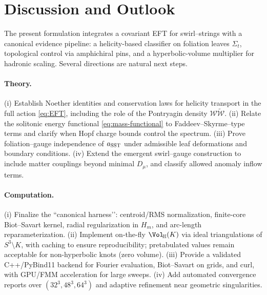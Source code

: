 \documentclass[preprint,titlepage]{revtex4-2}
\begin{document}
    \section{Discussion and Outlook}

    The present formulation integrates a covariant EFT for swirl–strings with a canonical evidence pipeline: a helicity-based classifier on foliation leaves \(\Sigma_t\), topological control via amphichiral pins, and a hyperbolic-volume multiplier for hadronic scaling. Several directions are natural next steps.

    \paragraph{Theory.}
    (i) Establish Noether identities and conservation laws for helicity transport in the full action \eqref{eq:EFT}, including the role of the Pontryagin density \(\mathcal{W}\tilde{\mathcal{W}}\).
    (ii) Relate the solitonic energy functional \eqref{eq:mass-functional} to Faddeev–Skyrme–type terms and clarify when Hopf charge bounds control the spectrum.
    (iii) Prove foliation–gauge independence of \(a_{\rm SST}\) under admissible leaf deformations and boundary conditions.
    (iv) Extend the emergent swirl–gauge construction to include matter couplings beyond minimal \(D_\mu\), and classify allowed anomaly inflow terms.

    \paragraph{Computation.}
    (i) Finalize the “canonical harness’’: centroid/RMS normalization, finite-core Biot–Savart kernel, radial regularization in \(H_m\), and arc-length reparameterization.
    (ii) Implement on-the-fly \(\Vol_{\!\mathbb{H}}(K)\) via ideal triangulations of \(S^3\!\setminus\!K\), with caching to ensure reproducibility; pretabulated values remain acceptable for non-hyperbolic knots (zero volume).
    (iii) Provide a validated C++/PyBind11 backend for Fourier evaluation, Biot–Savart on grids, and curl, with GPU/FMM acceleration for large sweeps.
    (iv) Add automated convergence reports over \((32^3,48^3,64^3)\) and adaptive refinement near geometric singularities.
\end{document}
